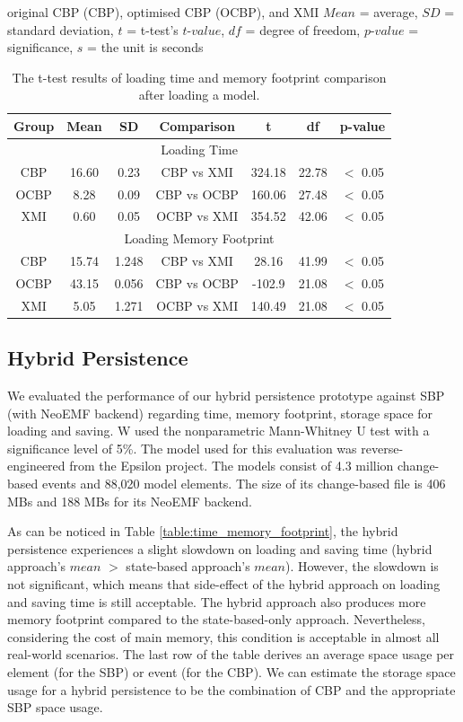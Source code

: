 \documentclass[sigplan,review,anonymous]{acmart}\settopmatter{printfolios=true,printccs=false,printacmref=false}
\begin{document}
original CBP (CBP), optimised CBP (OCBP), and XMI
$Mean$ = average, $SD$ = standard deviation, $t$ = t-test's $t$-$value$, $df$ = degree of freedom, $p$-$value$ = significance, $s$ = the unit is seconds
\begin{table}[ht]
    \footnotesize
    \centering
    \caption{The t-test results of loading time and memory footprint comparison after loading a model.}
    \label{table:ttest_results_loadtime}
    \begin{tabular}
        {| c c c | c c c c |}
        \hline 
        Group & Mean & SD & Comparison & t  & df & p-value \\  
         \hline 
        \multicolumn{7}{|c|}{Loading Time} \\
        \hline
        CBP & 16.60    & 0.23 &  CBP vs XMI & 324.18   &22.78 & $<$ 0.05 \\
        OCBP &  8.28  &  0.09 & CBP vs OCBP & 160.06 & 27.48 & $<$ 0.05 \\  
        XMI & 0.60   & 0.05 & OCBP vs XMI & 354.52   &42.06  & $<$ 0.05 \\ 
        \hline 
        \multicolumn{7}{|c|}{Loading Memory Footprint} \\
        \hline
        CBP &15.74    & 1.248 &  CBP vs XMI & 28.16   &  41.99 & $<$ 0.05 \\
        OCBP & 43.15   & 0.056 & CBP vs OCBP & -102.9 &21.08 & $<$ 0.05 \\  
        XMI & 5.05   & 1.271 & OCBP vs XMI & 140.49  & 21.08  & $<$ 0.05 \\ 
        \hline 
    \end{tabular}
\end{table}


\subsection{Hybrid Persistence}
We evaluated the performance of our hybrid persistence prototype against SBP (with NeoEMF backend) regarding time, memory footprint, storage space for loading and saving. W used the nonparametric Mann-Whitney U test with a significance level of 5\%. The model used for this evaluation was reverse-engineered from the Epsilon project. The models consist of 4.3 million change-based events and 88,020 model elements. The size of its change-based file is 406 MBs and  188 MBs for its NeoEMF backend.

As can be noticed in Table \ref{table:time_memory_footprint}, the hybrid persistence experiences a slight slowdown on loading and saving time (hybrid approach's $mean$ $>$ state-based approach's $mean$). However, the slowdown is not significant, which means that side-effect of the hybrid approach on loading and saving time is still acceptable. The hybrid approach also produces more memory footprint compared to the state-based-only approach. Nevertheless, considering the cost of main memory, this condition is acceptable in almost all real-world scenarios. The last row of the table derives an average space usage per element (for the SBP) or event (for the CBP). We can estimate the storage space usage for a hybrid persistence to be the combination of CBP and the appropriate SBP space usage.
\end{document}
